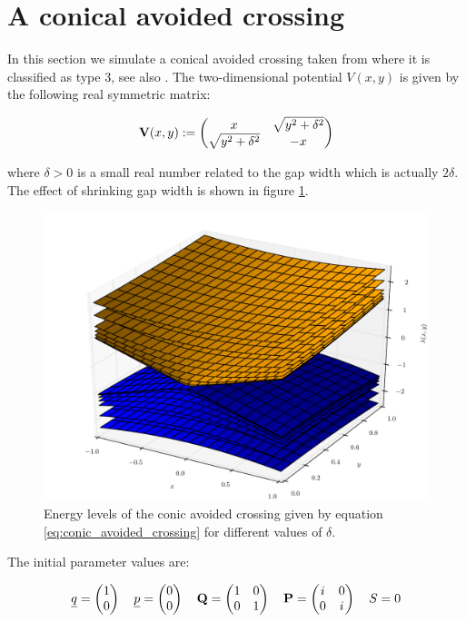 \FloatBarrier
\section{A conical avoided crossing}

In this section we simulate a conical avoided crossing taken from
\cite{HJ_molecularpropagation} where it is classified as type 3,
see also \cite{H_crossing_classification}. The two-dimensional
potential $V(x,y)$ is given by the following real symmetric matrix:

\begin{equation} \label{eq:conic_avoided_crossing}
  \mathbf{V}(x,y) :=
  \begin{pmatrix}
    x                   & \sqrt{y^2+\delta^2} \\
    \sqrt{y^2+\delta^2} & -x
  \end{pmatrix}
\end{equation}

where $\delta > 0$ is a small real number related to the gap width
which is actually $2\delta$. The effect of shrinking gap width is shown
in figure \ref{fig:conic_avoided_crossing_levels}.

\begin{figure}[ht!]
  \centering
  \includegraphics[width=0.7\linewidth]{./fig/conic_shells_0.pdf}
  \caption{Energy levels of the conic avoided crossing given by equation \eqref{eq:conic_avoided_crossing}
          for different values of $\delta$.}
  \label{fig:conic_avoided_crossing_levels}
\end{figure}

The initial parameter values are:

\begin{align*}
  \underline{q} = \begin{pmatrix}
              1 \\ 0
            \end{pmatrix}
  \quad
  \underline{p} = \begin{pmatrix}
              0 \\ 0
            \end{pmatrix}
  \quad
  \mathbf{Q} = \begin{pmatrix}
              1 & 0 \\ 0 & 1
            \end{pmatrix}
  \quad
  \mathbf{P} = \begin{pmatrix}
              i & 0 \\ 0 & i
            \end{pmatrix}
  \quad
  S = 0
\end{align*}

